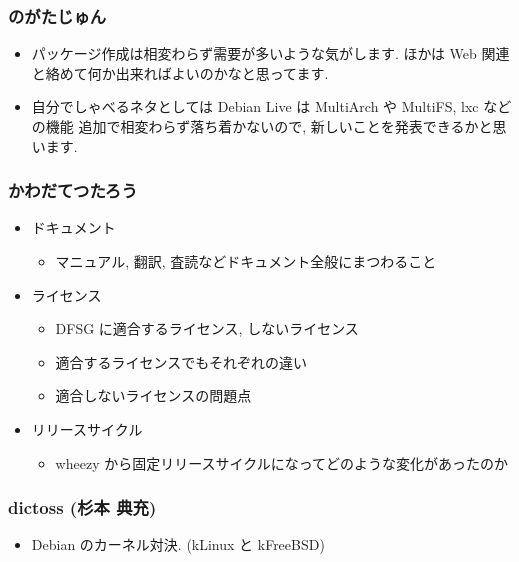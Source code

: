 \documentclass[cjk,dvipdfmx,12pt,%
hyperref={bookmarks=true,bookmarksnumbered=true,bookmarksopen=false,%
colorlinks=false,%
pdftitle={第 42 回 関西 Debian 勉強会},%
pdfauthor={倉敷・のがた・佐々木},%
pdfsubject={資料},%
}]{beamer}
\begin{document}
\begin{frame}[fragile]
\frametitle{ のがたじゅん }

\begin{itemize}
\item パッケージ作成は相変わらず需要が多いような気がします.
ほかは Web 関連と絡めて何か出来ればよいのかなと思ってます.
\item 自分でしゃべるネタとしては Debian Live は MultiArch や MultiFS, lxc などの機能
追加で相変わらず落ち着かないので, 新しいことを発表できるかと思います.
\end{itemize}

\end{frame}

\begin{frame}[fragile]
\frametitle{ かわだてつたろう }

\begin{itemize}
\item ドキュメント

\begin{itemize}
\item マニュアル, 翻訳, 査読などドキュメント全般にまつわること
\end{itemize}
\item ライセンス

\begin{itemize}
\item DFSG に適合するライセンス, しないライセンス
\item 適合するライセンスでもそれぞれの違い
\item 適合しないライセンスの問題点
\end{itemize}
\item リリースサイクル

\begin{itemize}
\item wheezy から固定リリースサイクルになってどのような変化があったのか
\end{itemize}
\end{itemize}

\end{frame}

\begin{frame}[fragile]
\frametitle{ dictoss (杉本  典充) }

\begin{itemize}
\item Debian のカーネル対決. (kLinux と kFreeBSD)
\end{itemize}

\end{frame}
\end{document}

